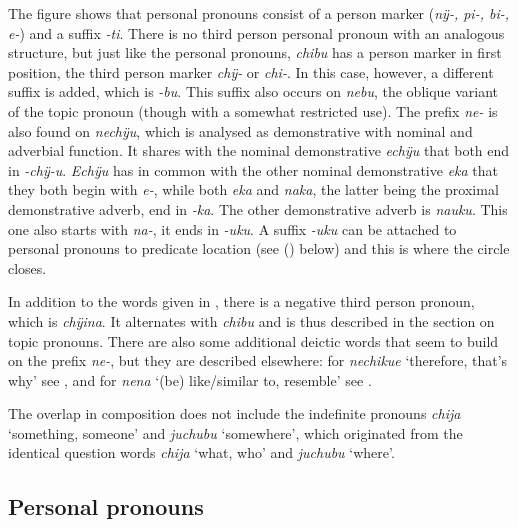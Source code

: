 \largerpage
The figure shows that personal pronouns consist of a person marker (\textit{nÿ-, pi-, \mbox{bi-,} e-}) and a suffix \textit{-ti}. There is no third person personal pronoun with an analogous structure, but just like the personal pronouns, \textit{chibu} has a person marker in first position, the third person marker \textit{chÿ-} or \textit{chi-}. In this case, however, a different suffix is added, which is \mbox{\textit{-bu}}. This suffix also occurs on \textit{nebu}, the oblique variant of the topic pronoun (though with a somewhat restricted use). The prefix \textit{ne-} is also found on \textit{nechÿu}, which is analysed as demonstrative with nominal and adverbial function. It shares with the nominal demonstrative \textit{echÿu} that both end in \textit{-chÿ-u}. \textit{Echÿu} has in common with the other nominal demonstrative \textit{eka} that they both begin with \textit{e-}, while both \textit{eka} and \textit{naka}, the latter being the proximal demonstrative adverb, end in \textit{-ka}. The other demonstrative adverb is \textit{nauku}. This one also starts with \textit{na-}, it ends in \textit{-uku}. A suffix \textit{-uku} can be attached to personal pronouns to predicate location (see () below) and this is where the circle closes.

In addition to the words given in , there is a negative third person pronoun, which is \textit{chÿina}. It alternates with \textit{chibu} and is thus described in the section on topic pronouns. There are also some additional deictic words that seem to build on the prefix \textit{ne-}, but they are described elsewhere: for \textit{nechikue} ‘therefore, that’s why’ see , and for \textit{nena} ‘(be) like/similar to, resemble’ see . 

The overlap in composition does not include the indefinite pronouns \textit{chija} ‘something, someone’ and \textit{juchubu} ‘somewhere’, which originated from the identical question words \textit{chija} ‘what, who’ and \textit{juchubu} ‘where’.

\largerpage
\subsection{Personal pronouns}\label{sec:PersPron}

